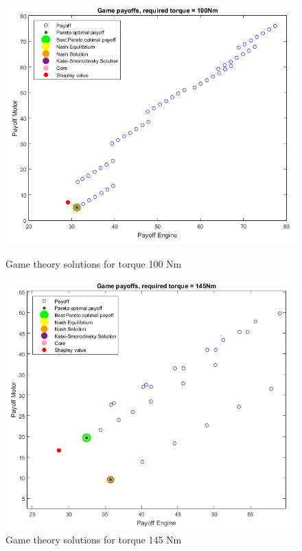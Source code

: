 \begin{figure}[h]
\centering
\begin{minipage}{.5\textwidth}
 	\centering
	\includegraphics[scale=0.406]{figures/gametheory/100nm}
	\caption{Game theory solutions for torque 100 Nm}
	\label{fig:100nm}
\end{minipage}%
\begin{minipage}{.5\textwidth}
  	\centering
	\includegraphics[scale=0.385]{figures/gametheory/145nm}
  	\caption{Game theory solutions for torque 145 Nm}
  	\label{fig:145nm}
\end{minipage}
\end{figure}

